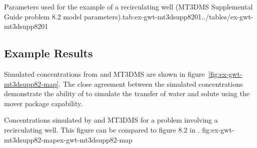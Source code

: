 \begin{StandardTable}{Parameters used for the example of a recirculating well (MT3DMS Supplemental Guide problem 8.2 model parameters).}{tab:ex-gwt-mt3dsupp8201}{../tables/ex-gwt-mt3dsupp8201}
\end{StandardTable}

\subsection{Example Results}

Simulated concentrations from \mf and MT3DMS are shown in figure~\ref{fig:ex-gwt-mt3dsupp82-map}.  The close agreement between the simulated concentrations demonstrate the ability of \mf to simulate the transfer of water and solute using the mover package capability.

\begin{StandardFigure}{
                                     Concentrations simulated by \mf and MT3DMS for a problem involving a recirculating well.  This figure can be compared to figure 8.2 in \cite{zheng2010mt3dmsv5.3}.
                                     }{fig:ex-gwt-mt3dsupp82-map}{ex-gwt-mt3dsupp82-map}
\end{StandardFigure}                                 

